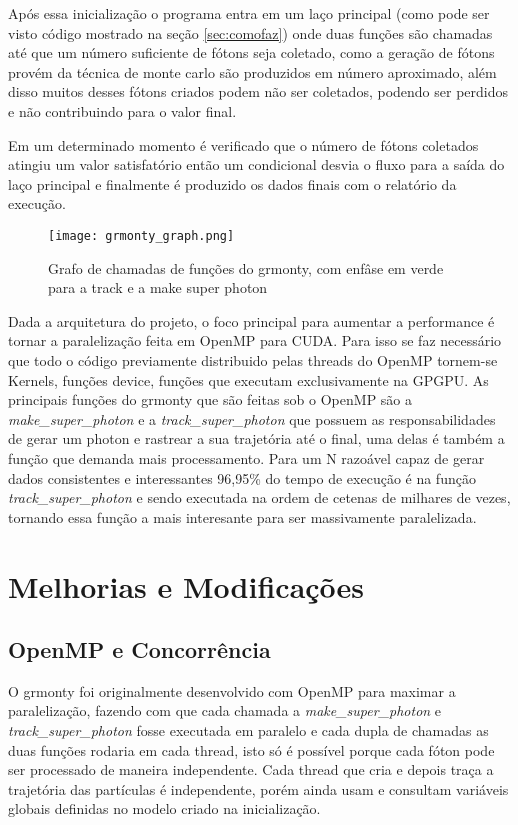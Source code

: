   Após essa inicialização o programa entra em um laço principal (como pode ser visto código mostrado na seção \ref{sec:comofaz}) onde duas funções são chamadas até que um número suficiente de fótons seja coletado, como a geração de fótons provém da técnica de monte carlo são produzidos em número aproximado, além disso muitos desses fótons criados podem não ser coletados, podendo ser perdidos e não contribuindo para o valor final.

  Em um determinado momento é verificado que o número de fótons coletados atingiu um valor satisfatório então um condicional desvia o fluxo para a saída do laço principal e finalmente é produzido os dados finais com o relatório da execução.

  \begin{figure}[!h]
    \centering
    \texttt{[image: grmonty\_graph.png]}
    \caption{Grafo de chamadas de funções do grmonty, com enfâse em verde para a track e a make super photon}
    \label{fig:grmontyGraph}
  \end{figure}


  Dada a arquitetura do projeto, o foco principal para aumentar a performance é tornar a paralelização feita em OpenMP para CUDA. Para isso se faz necessário que todo o código previamente distribuido pelas threads do OpenMP tornem-se Kernels, funções device, funções que executam exclusivamente na GPGPU. As principais funções do grmonty que são feitas sob o OpenMP são a \textit{make\_super\_photon} e a \textit{track\_super\_photon} que possuem as responsabilidades de gerar um photon e rastrear a sua trajetória até o final, uma delas é também a função que demanda mais processamento. Para um N razoável capaz de gerar dados consistentes e interessantes 96,95\% do tempo de execução é na função \textit{track\_super\_photon} e sendo executada na ordem de cetenas de milhares de vezes, tornando essa função a mais interesante para ser massivamente paralelizada.

\section{Melhorias e Modificações}
  \subsection{OpenMP e Concorrência}
    O grmonty foi originalmente desenvolvido com OpenMP para maximar a paralelização, fazendo com que cada chamada a \textit{make\_super\_photon} e \textit{track\_super\_photon} fosse executada em paralelo e cada dupla de chamadas as duas funções rodaria em cada thread, isto só é possível porque cada fóton pode ser processado de maneira independente. Cada thread que cria e depois traça a trajetória das partículas é independente, porém ainda usam e consultam variáveis globais definidas no modelo criado na inicialização.

